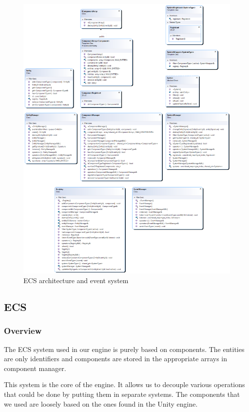 \documentclass[12pt, english]{article}
\begin{document}
\begin{figure}
	\centering
	\includegraphics[width=\textwidth, height=0.9\textheight, keepaspectratio]{ecs.png}
	\caption{ECS architecture and event system}
	\label{figure_ecs_event}
\end{figure}


\subsection{ECS}

\subsubsection{Overview}
The ECS system used in our engine is purely based on components. The entities
are only identifiers and components are stored in the appropriate arrays in
component manager.

This system is the core of the engine. It allows us to decouple various
operations that could be done by putting them in separate systems. The
components that we used are loosely based on the ones found in the Unity
engine.
\end{document}
